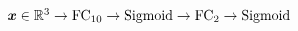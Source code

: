 $\vect{x} \in \real^3
	\newline \rightarrow \text{FC}_{10} \rightarrow \text{Sigmoid}
	\newline \rightarrow \text{FC}_{2} \rightarrow \text{Sigmoid}$